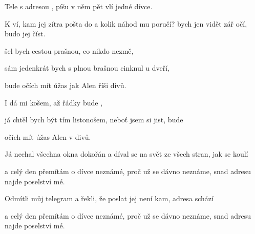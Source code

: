 
  \zs

Tele s adresou , píšu v něm pět vlí 
  jedné dívce.

K ví, kam jej zítra pošta do a kolik náhod mu poručí?  
 bych jen vidět zář očí,  budo jej číst. 

\ks
\zr

 šel bych cestou prašnou, co nikdo nezmě,

sám jedenkrát bych s plnou brašnou cinknul u dveří,

bude  očích mít úžas jak Alen  říši divů.

I  dá mi košem, až řádky bude ,

já chtěl bych být tím listonošem, neboť jsem si jist, bude

 očích mít úžas  Alen v  divů. 

\kr
\zs

Já nechal všechna okna dokořán a díval se na svět ze všech stran, jak se koulí

a celý den přemítám o dívce neznámé, proč už se dávno neznáme, snad adresu 
najde poselství mé. 

\ks
\zr  \kr
\zs

Odmítli můj telegram a řekli, že poslat jej není kam, adresa schází

a celý den přemítám o dívce neznámé, proč už se dávno neznáme, snad adresu 
najde poselství mé.

\ks

\zr  \kr

\kp

